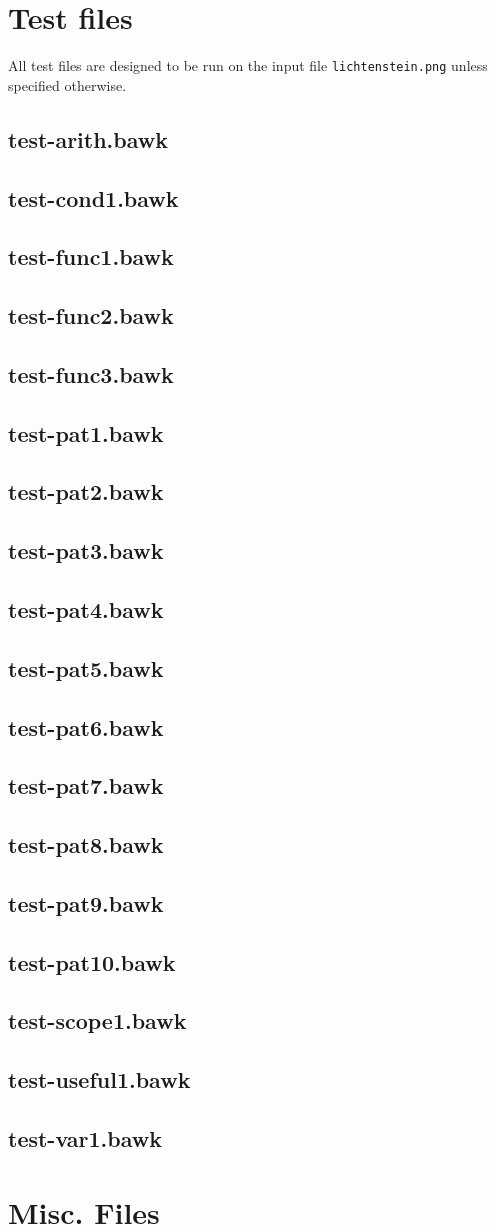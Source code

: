 \documentclass[letterpaper,11pt]{report}
\newcommand{\testfile}[1]{%
	\subsection{#1}
	
	}
\begin{document}
\section{Test files}
\label{sec:test-files}
All test files are designed to be run on the input file \texttt{lichtenstein.png} unless specified otherwise.  
\testfile{test-arith.bawk}
\testfile{test-cond1.bawk}
\testfile{test-func1.bawk}
\testfile{test-func2.bawk}
\testfile{test-func3.bawk}
\testfile{test-pat1.bawk}
\testfile{test-pat2.bawk}
\testfile{test-pat3.bawk}
\testfile{test-pat4.bawk}
\testfile{test-pat5.bawk}
\testfile{test-pat6.bawk}
\testfile{test-pat7.bawk}
\testfile{test-pat8.bawk}
\testfile{test-pat9.bawk}
\testfile{test-pat10.bawk}
\testfile{test-scope1.bawk}
\testfile{test-useful1.bawk}
\testfile{test-var1.bawk}

\section{Misc. Files}


\end{document}

